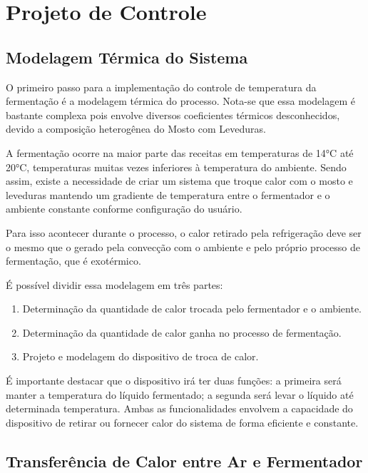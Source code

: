 \section{Projeto de Controle}

\subsection{Modelagem Térmica do Sistema}

O primeiro passo para a implementação do controle de temperatura da fermentação é a modelagem térmica do processo. Nota-se que essa modelagem é bastante complexa pois envolve diversos coeficientes térmicos desconhecidos, devido a composição heterogênea do Mosto com Leveduras. 


A fermentação ocorre na maior  parte das receitas em temperaturas de 14°C até 20°C,  temperaturas muitas vezes inferiores à temperatura do ambiente. Sendo assim, existe a necessidade de criar um sistema que troque calor com o mosto e leveduras mantendo um gradiente de temperatura entre o fermentador e o ambiente constante conforme configuração do usuário. 


Para isso acontecer durante o processo, o calor retirado pela refrigeração deve ser o mesmo que o gerado pela convecção com o ambiente e pelo próprio processo de fermentação, que é exotérmico. 


É possível dividir essa modelagem em três partes:  
\begin{enumerate}
    \item Determinação da quantidade de calor trocada pelo fermentador e o ambiente.
    \item Determinação da quantidade de calor ganha no processo de fermentação.
    \item Projeto e modelagem do dispositivo de troca de calor.
\end{enumerate}
    

É importante destacar que o dispositivo irá ter duas funções: a primeira será manter a temperatura do líquido fermentado; a segunda será levar o líquido até determinada temperatura. Ambas as funcionalidades envolvem a capacidade do dispositivo de retirar ou fornecer calor do sistema de forma eficiente e constante. 


\subsection{Transferência de Calor entre Ar e Fermentador}

